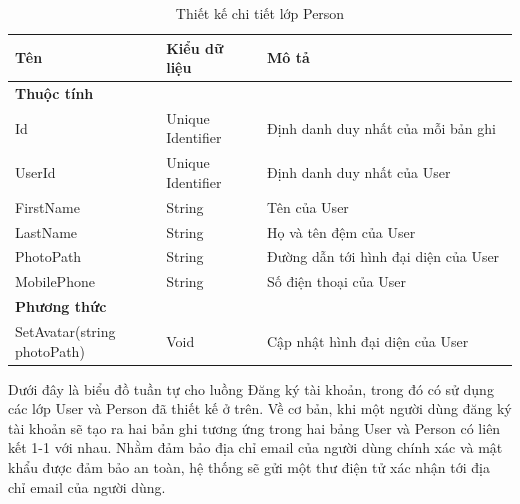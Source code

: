 \documentclass[../DoAn.tex]{subfiles}
\begin{document}
\newpage

\begin{table}[H]
    \renewcommand{\arraystretch}{1.2}
    \centering{}
    \begin{tabular}{p{0.3\linewidth}p{0.2\linewidth}p{0.5\linewidth}}
        \hline
        \textbf{Tên}                & \textbf{Kiểu dữ liệu} & \textbf{Mô tả}                       \\ \hline
        \textbf{Thuộc tính}                                                                        \\ \hline
        Id                          & Unique Identifier     & Định danh duy nhất của mỗi bản ghi   \\ \hline
        UserId                      & Unique Identifier     & Định danh duy nhất của User          \\ \hline
        FirstName                   & String                & Tên của User                         \\ \hline
        LastName                    & String                & Họ và tên đệm của User               \\ \hline
        PhotoPath                   & String                & Đường dẫn tới hình đại diện của User \\ \hline
        MobilePhone                 & String                & Số điện thoại của User               \\ \hline
        \textbf{Phương thức}                                                                       \\ \hline
        SetAvatar(string photoPath) & Void                  & Cập nhật hình đại diện của User      \\ \hline
    \end{tabular}
    \renewcommand{\arraystretch}{1}
    \caption{Thiết kế chi tiết lớp Person}
    \label{fig:classdesign_person}
\end{table}

Dưới đây là biểu đồ tuần tự cho luồng Đăng ký tài khoản, trong đó có sử dụng các lớp User và Person đã thiết kế ở trên.
Về cơ bản, khi một người dùng đăng ký tài khoản sẽ tạo ra hai bản ghi tương ứng trong hai bảng User và Person có liên kết 1-1 với nhau.
Nhằm đảm bảo địa chỉ email của người dùng chính xác và mật khẩu được đảm bảo an toàn, hệ thống sẽ gửi một thư điện tử xác nhận tới địa chỉ email của người dùng.
\end{document}
